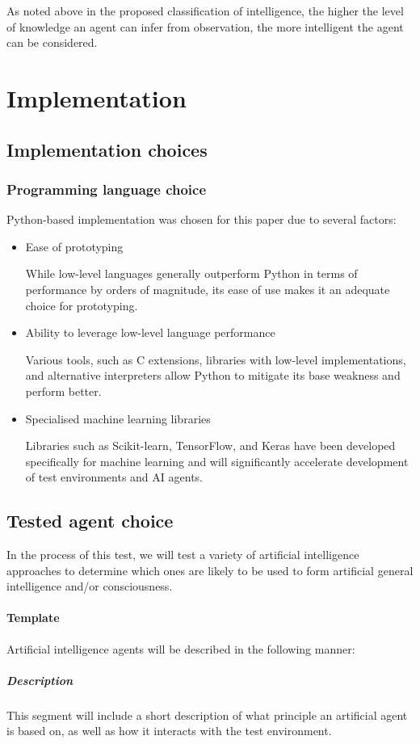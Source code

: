 \documentclass[masterthesis]{fer}
\begin{document}
As noted above in the proposed classification of intelligence, the higher the level of knowledge an agent can infer from observation, the more intelligent the agent can be considered.

\chapter{Implementation}

\section{Implementation choices}
\subsection{Programming language choice}
Python-based implementation was chosen for this paper due to several factors:
\begin{itemize}
\item Ease of prototyping

While low-level languages generally outperform Python in terms of performance by orders of magnitude, its ease of use makes it an adequate choice for prototyping.
\item Ability to leverage low-level language performance

Various tools, such as C extensions, libraries with low-level implementations, and alternative interpreters allow Python to mitigate its base weakness and perform better.
\item Specialised machine learning libraries

Libraries such as Scikit-learn, TensorFlow, and Keras have been developed specifically for machine learning and will significantly accelerate development of test environments and AI agents.
\end{itemize}
\section{Tested agent choice}
In the process of this test, we will test a variety of artificial intelligence approaches to determine which ones are likely to be used to form artificial general intelligence and/or consciousness.
\subsubsection{Template}
Artificial intelligence agents will be described in the following manner:
\paragraph{Description}
This segment will include a short description of what principle an artificial agent is based on, as well as how it interacts with the test environment.
\end{document}
